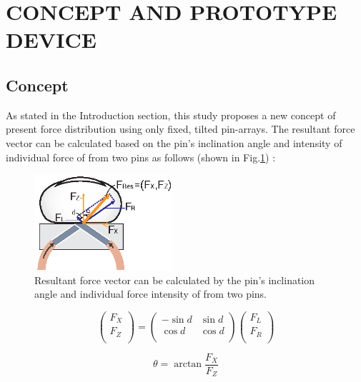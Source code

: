 \section{CONCEPT AND PROTOTYPE DEVICE}

\subsection{Concept}

As stated in the Introduction section, this study proposes a new concept of present force distribution using only fixed, tilted pin-arrays.
The resultant force vector can be calculated based on the pin's inclination angle and intensity of individual force of from two pins as follows (shown in Fig.\ref{fig_stimulus}) :

\begin{figure}[h]
  \centering
  \includegraphics[width=2.0in]{images/fig_stimulus}
  \caption{Resultant force vector can be calculated by the pin's inclination angle and individual force intensity of from two pins.}
  \label{fig_stimulus}
\end{figure}


\begin{equation}
\label{eq:1}
\left(
\begin{array}{c}
F_{X} \\
F_{Z} \\
\end{array}
\right)
= 
\left(
\begin{array}{cc}
-\sin{d} & \sin{d} \\
\cos{d} & \cos{d} \\
\end{array}
\right)
\left(
\begin{array}{c}
F_{L} \\
F_{R} \\
\end{array}
\right)
\end{equation}

\begin{equation}
\label{eq:theta}
\theta = \arctan{ \frac{F_{X}}{F_{Z}} }
\end{equation}

